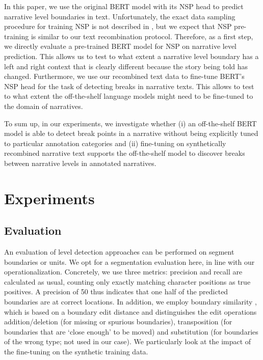 \documentclass[10pt, a4paper]{article}
\begin{document}
In this paper, we use the original BERT model with its NSP head to predict narrative level boundaries in text.
Unfortunately, the exact data sampling procedure for training NSP is not described in \cite{devlin_bert_2019}, but we expect that NSP pre-training is similar to our text recombination protocol. 
Therefore, as a first step, we directly evaluate a pre-trained BERT model for NSP on narrative level prediction.
This allows us to test to what extent a narrative level boundary has a left and right context that is clearly different because the story being told has changed.
Furthermore, we use our recombined text data to fine-tune BERT's NSP head for the task of detecting breaks in narrative texts.
This allows to test to what extent the off-the-shelf language models might need to be fine-tuned to the domain of narratives.

To sum up, in our experiments, we investigate whether (i) an off-the-shelf BERT model is able to detect break points in a narrative without being explicitly tuned to particular annotation categories and (ii) fine-tuning on synthetically recombined narrative text supports the off-the-shelf model to discover breaks between narrative levels in annotated narratives.

\section{Experiments}
\label{sec:experiments}

\subsection{Evaluation}
\label{sec:operationalisation}


An evaluation of level detection approaches can be performed on segment boundaries or units. We opt for a segmentation evaluation here, in line with our operationalization. Concretely, we use three metrics: precision and recall are calculated as usual, counting only exactly matching character positions as true positives. A precision of 50 thus indicates that one half of the predicted boundaries are at correct locations. In addition, we employ boundary similarity \cite{fournier-2013-evaluating}, which is based on a boundary edit distance and distinguishes the edit operations addition/deletion (for missing or spurious boundaries), transposition (for boundaries that are \enquote*{close enough} to be moved) and substitution (for boundaries of the wrong type; not used in our case). We particularly look at the impact of the fine-tuning on the synthetic training data.
\end{document}
